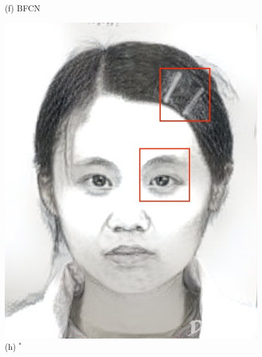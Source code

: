 \documentclass[10pt,twocolumn,letterpaper]{article}
\begin{document}
\begin{figure}[t]
\begin{minipage}[t]{0.23\linewidth}
(f) BFCN \cite{zhang2017content}
\end{minipage}
\begin{minipage}[t]{0.24\linewidth}
\centering
\includegraphics[width=1\linewidth]{img/example_deepart.jpg}
(h) \cite{gatys2015neural}$^*$
\end{minipage}
\begin{minipage}[t]{0.24\linewidth}
\centering

\end{minipage}
\end{figure}
\end{document}
